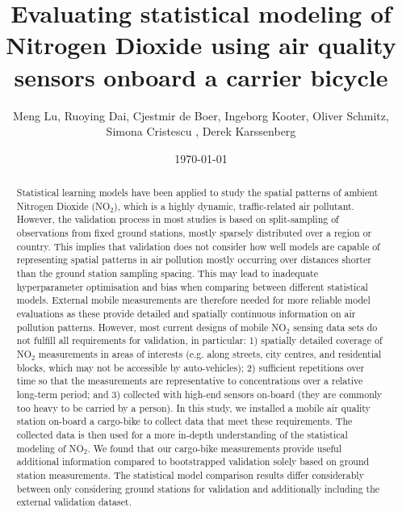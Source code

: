 \documentclass{article}
\title{Evaluating statistical modeling of Nitrogen Dioxide using air quality sensors onboard a carrier bicycle}
\author{Meng Lu,  Ruoying Dai,  Cjestmir de Boer, Ingeborg Kooter, Oliver Schmitz, Simona Cristescu , Derek Karssenberg}
\date{\today}
\begin{document}
\maketitle

\begin{abstract}
Statistical learning models have been applied to study the spatial patterns of ambient Nitrogen Dioxide (NO$_2$), which is a highly dynamic, traffic-related air pollutant. However, the validation process in most studies is based on split-sampling of observations from fixed ground stations, mostly sparsely distributed over a region or country. This implies that validation does not consider how well models are capable of representing spatial patterns in air pollution mostly occurring over distances shorter than the ground station sampling spacing. This may lead to inadequate hyperparameter optimisation and bias when comparing between different statistical models. External mobile measurements are therefore needed for more reliable model evaluations as these provide detailed and spatially continuous information on air pollution patterns. However, most current designs of mobile NO$_2$ sensing data sets do not fulfill all requirements for validation, in particular: 1) spatially detailed coverage of NO$_2$ measurements in areas of interests (e.g. along streets, city centres, and residential blocks, which may not be accessible by auto-vehicles); 2) sufficient repetitions over time so that the measurements are representative to concentrations over a relative long-term period; and 3) collected with high-end sensors on-board (they are commonly too heavy to be carried by a person). In this study, we installed a mobile air quality station on-board  a cargo-bike to collect data that meet these requirements. The collected data is then used for a more in-depth understanding of the statistical modeling of NO$_2$. We found that our cargo-bike measurements provide useful additional information compared to bootstrapped validation solely based on ground station measurements. The statistical model comparison results differ considerably between only considering ground stations for validation and additionally including the external validation dataset. 

 
\end{abstract}
\end{document}
